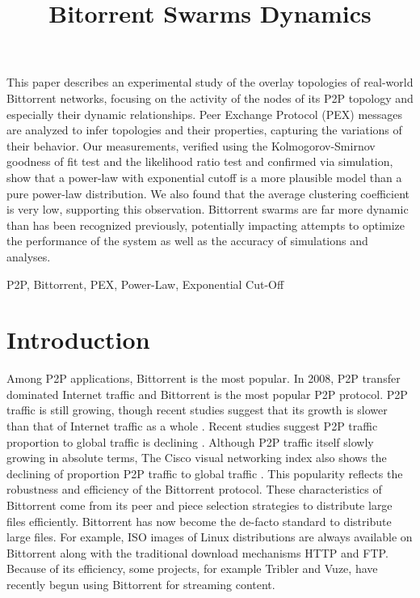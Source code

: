 \documentclass[paper]{ieice}
\title{Bitorrent Swarms Dynamics}
\begin{document}
\maketitle

\begin{summary}
This paper describes an experimental study of the overlay topologies of real-world Bittorrent networks, focusing on the activity of the nodes of its P2P topology and especially their dynamic relationships. 
Peer Exchange Protocol (PEX) messages are analyzed to infer topologies and their properties, capturing the variations of their behavior.  
Our measurements, verified using the Kolmogorov-Smirnov goodness of fit test and the likelihood ratio test and confirmed via simulation, show that a power-law with exponential cutoff is a more plausible model than a pure power-law distribution.  
We also found that the average clustering coefficient is very low, supporting this observation.  
Bittorrent swarms are far more dynamic than has been recognized previously, potentially impacting attempts to optimize the performance of the system as well as the accuracy of simulations and analyses.
\end{summary}
\begin{keywords}
P2P, Bittorrent, PEX, Power-Law, Exponential Cut-Off
\end{keywords}


\section{Introduction}
Among P2P applications, Bittorrent is the most popular. 
In 2008, P2P transfer dominated Internet traffic and Bittorrent is the most popular P2P protocol.
P2P traffic is still growing, though recent studies suggest that its growth is slower than that of Internet traffic as a whole  \cite{labovitz2010internet} \cite{index2010forecast}. 
Recent studies suggest P2P traffic proportion to global traffic is declining \cite{labovitz2010internet}.
Although P2P traffic itself slowly growing in absolute terms, The Cisco visual networking index also shows the declining of proportion P2P traffic to global traffic \cite{index2010forecast}.
This popularity reflects the robustness and efficiency of the Bittorrent protocol. 
These characteristics of Bittorrent come from its peer and piece selection strategies to distribute large files efficiently. 
Bittorrent has now become the de-facto standard to distribute large files. 
For example, ISO images of Linux distributions are always available on Bittorrent along with the traditional download mechanisms HTTP and FTP.  
Because of its efficiency, some projects, for example Tribler and Vuze, have recently begun using Bittorrent for streaming content.
\end{document}
